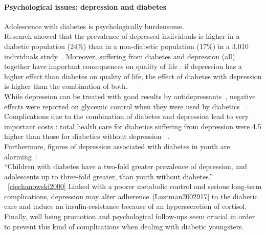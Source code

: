\paragraph{Psychological issues: depression and diabetes}
Adolescence with diabetes is psychologically burdensome. 
\\
Research showed that the prevalence of depressed individuals is higher in a diabetic population (24\%) than in a non-diabetic population (17\%) in a 3,010 individuals study~\cite{goldney2004diabetes}. Moreover, suffering from diabetes and depression (all) together have important consequences on quality of life : if depression has a higher effect than diabetes on quality of life, the effect of diabetes with depression is higher than the combination of both. 
\\
While depression can be treated with good results by antidepressants~\cite{Goodnick2000}, negative effects were reported on glycemic control when they were used by diabetics ~\cite{Lustman2002917}. Complications due to the combination of diabetes and depression lead to very important costs : total health care for diabetics suffering from depression were 4.5 higher than those for diabetics without depression ~\cite{egede2002comorbid}.
\\
Furthermore, figures of depression associated with diabetes in youth are alarming~\cite{Grey2002907}:\\
``Children with diabetes have a two-fold greater prevalence of depression, and adolescents up to three-fold greater, than youth without diabetes.''\\
~\ref{ciechanowski2000}
Linked with a poorer metabolic control and serious long-term complications, depression may alter adherence~\ref{Lustman2002917} to the diabetic care and induce an insulin-resistance because of an hypersecretion of cortisol. %
\\
Finally, well being promotion and psychological follow-ups seem crucial in order to prevent this kind of complications when dealing with diabetic youngsters.
\\


